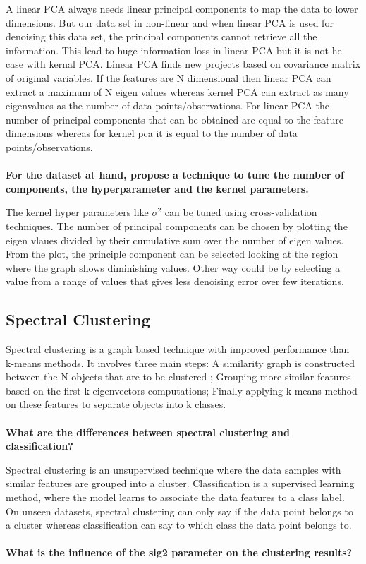 A linear PCA always needs linear principal components to map the data to lower dimensions. But our data set in non-linear and when linear PCA is used for denoising this data set, the principal components cannot retrieve all the information. This lead to huge information loss in linear PCA but it is not he case with kernal PCA. Linear PCA finds new projects based on covariance matrix of original variables. If the features are N dimensional then linear PCA can extract a maximum of N eigen values whereas  kernel PCA can extract as many eigenvalues as the number of data points/observations. For linear PCA the number of principal components that can be obtained are equal to the feature dimensions whereas for kernel pca it is equal to the number of data points/observations.\\\\
\textbf{For the dataset at hand, propose a technique to tune the number of components, the
	hyperparameter and the kernel parameters.}

The kernel hyper parameters like $\sigma^2$ can be tuned using cross-validation techniques. The number of principal components can be chosen by plotting the eigen vlaues divided by their cumulative sum over the number of eigen values. From the plot, the principle component can be selected looking at the region where the graph shows diminishing values. Other way could be by selecting a value from a range of values that gives less denoising error over few iterations.

\subsection{Spectral Clustering}
Spectral clustering is a graph based technique with improved performance than k-means methods. It involves three main steps: A similarity graph is constructed between the N objects that are to be  clustered ; Grouping more similar features based on the first k eigenvectors computations; Finally applying k-means method on these features to separate objects into k classes. \\\\
\textbf{What are the differences between spectral clustering and classification?}

Spectral clustering is an unsupervised technique where the data samples with similar features are grouped into a cluster. Classification is a supervised learning method, where the model learns to associate the data features to a class label. On unseen datasets, spectral clustering can only say if the data point belongs to a cluster whereas classification can say to which class the data point belongs to.\\\\
\textbf{What is the influence of the sig2 parameter on the clustering results?} 

